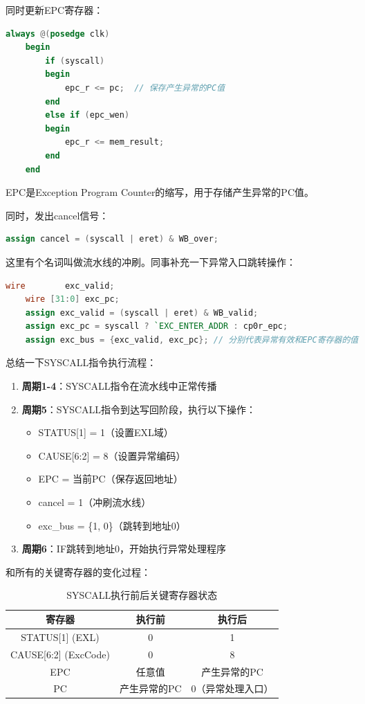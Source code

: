 \documentclass[a4paper]{article}
\begin{document}
同时更新EPC寄存器：

\begin{lstlisting}[language=Verilog, caption=EPC寄存器保存当前PC]
    always @(posedge clk)
    begin
        if (syscall)
        begin
            epc_r <= pc;  // 保存产生异常的PC值
        end
        else if (epc_wen)
        begin
            epc_r <= mem_result;
        end
    end
    \end{lstlisting}

EPC是Exception Program Counter的缩写，用于存储产生异常的PC值。

同时，发出cancel信号：

\begin{lstlisting}[language=Verilog, caption=cancel信号发出]
    assign cancel = (syscall | eret) & WB_over;
\end{lstlisting}

这里有个名词叫做流水线的冲刷。同事补充一下异常入口跳转操作：
\begin{lstlisting}[language=Verilog, caption=异常PC总线]
    wire        exc_valid;
    wire [31:0] exc_pc;
    assign exc_valid = (syscall | eret) & WB_valid;
    assign exc_pc = syscall ? `EXC_ENTER_ADDR : cp0r_epc;
    assign exc_bus = {exc_valid, exc_pc}; // 分别代表异常有效和EPC寄存器的值
    \end{lstlisting}

总结一下SYSCALL指令执行流程：
    \begin{enumerate}
        \item \textbf{周期1-4}：SYSCALL指令在流水线中正常传播
        \item \textbf{周期5}：SYSCALL指令到达写回阶段，执行以下操作：
        \begin{itemize}
            \item STATUS[1] = 1（设置EXL域）
            \item CAUSE[6:2] = 8（设置异常编码）
            \item EPC = 当前PC（保存返回地址）
            \item cancel = 1（冲刷流水线）
            \item exc\_bus = \{1, 0\}（跳转到地址0）
        \end{itemize}
        \item \textbf{周期6}：IF跳转到地址0，开始执行异常处理程序
    \end{enumerate}

和所有的关键寄存器的变化过程：

\begin{table}[H]
    \centering
    \caption{SYSCALL执行前后关键寄存器状态}
    \begin{tabular}{|c|c|c|}
    \hline
    \textbf{寄存器} & \textbf{执行前} & \textbf{执行后} \\
    \hline
    STATUS[1] (EXL) & 0 & 1 \\
    \hline
    CAUSE[6:2] (ExcCode) & 0 & 8 \\
    \hline
    EPC & 任意值 & 产生异常的PC \\
    \hline
    PC & 产生异常的PC & 0（异常处理入口） \\
    \hline
    \end{tabular}
    \end{table}
\end{document}
